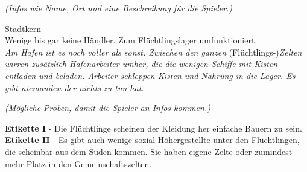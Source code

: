 \textit{(Infos wie Name, Ort und eine Beschreibung für die Spieler.)}

Stadtkern\\
Wenige bis gar keine Händler. Zum Flüchtlingslager umfunktioniert. \\

\textit{Am Hafen ist es noch voller als sonst. Zwischen den ganzen} (Flüchtlings-)\textit{Zelten wirren zusätzlich Hafenarbeiter umher, die die wenigen Schiffe mit Kisten entladen und beladen. Arbeiter schleppen Kisten und Nahrung in die Lager. Es gibt niemanden der nichts zu tun hat.}

\textit{(Mögliche Proben, damit die Spieler an Infos kommen.)}

\textbf{Etikette I} - Die Flüchtlinge scheinen der Kleidung her einfache Bauern zu sein.\\
\textbf{Etikette II} - Es gibt auch wenige sozial Höhergestellte unter den Flüchtlingen, die scheinbar aus dem Süden kommen. Sie haben eigene Zelte oder zumindest mehr Platz in den Gemeinschaftszelten.
